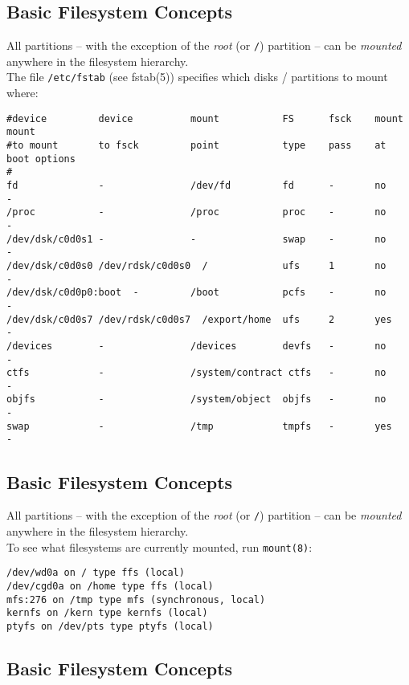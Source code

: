 \documentclass[xga]{xdvislides}
\begin{document}
\subsection{Basic Filesystem Concepts}
All partitions -- with the exception of the {\em root} (or \verb+/+) partition
-- can be {\em mounted} anywhere in the filesystem hierarchy.
\\

The file \verb+/etc/fstab+ (see fstab(5)) specifies which disks / partitions
to mount where:
\\
\small
\begin{verbatim}
#device         device          mount           FS      fsck    mount   mount
#to mount       to fsck         point           type    pass    at boot options
#
fd              -               /dev/fd         fd      -       no      -
/proc           -               /proc           proc    -       no      -
/dev/dsk/c0d0s1 -               -               swap    -       no      -
/dev/dsk/c0d0s0 /dev/rdsk/c0d0s0  /             ufs     1       no      -
/dev/dsk/c0d0p0:boot  -         /boot           pcfs    -       no      -
/dev/dsk/c0d0s7 /dev/rdsk/c0d0s7  /export/home  ufs     2       yes
-
/devices        -               /devices        devfs   -       no      -
ctfs            -               /system/contract ctfs   -       no      -
objfs           -               /system/object  objfs   -       no      -
swap            -               /tmp            tmpfs   -       yes     -
\end{verbatim}
\Normalsize



\subsection{Basic Filesystem Concepts}
All partitions -- with the exception of the {\em root} (or \verb+/+) partition
-- can be {\em mounted} anywhere in the filesystem hierarchy.
\\

To see what filesystems are currently mounted, run \verb+mount(8)+:
\\

\begin{verbatim}
/dev/wd0a on / type ffs (local)
/dev/cgd0a on /home type ffs (local)
mfs:276 on /tmp type mfs (synchronous, local)
kernfs on /kern type kernfs (local)
ptyfs on /dev/pts type ptyfs (local)
\end{verbatim}


\subsection{Basic Filesystem Concepts}
\\
\end{document}
